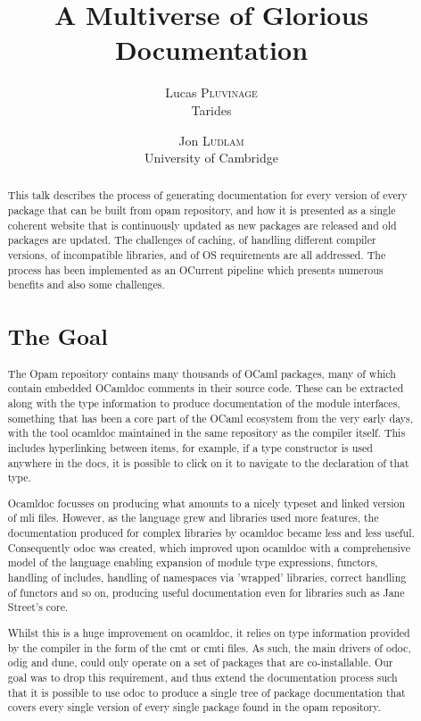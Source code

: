 \documentclass[a4paper,11pt,twocolumn]{scrartcl}
\title{A Multiverse of Glorious Documentation}
\author{
  Lucas \textsc{Pluvinage}\\
  Tarides
  \and
  Jon \textsc{Ludlam}\\
  University of Cambridge
}
\date{}
\begin{document}
\maketitle

\begin{abstract}

This talk describes the process of generating documentation for every version
of every package that can be built from opam repository, and how it is presented
as a single coherent website that is continuously updated as new packages are
released and old packages are updated. The challenges of caching, of handling
different compiler versions, of incompatible libraries, and of OS requirements are 
all addressed. The process has been implemented as an OCurrent pipeline which
presents numerous benefits and also some challenges.

\section{The Goal}
The Opam repository contains many thousands of OCaml packages, many of which
contain embedded OCamldoc comments in their source code. These can be extracted along with the type
information to produce documentation of the module interfaces, something that
has been a core part of the OCaml ecosystem from the very early days, with
the tool ocamldoc maintained in the same repository as the compiler itself. This
includes hyperlinking between items, for example, if a type constructor is used
anywhere in the docs, it is possible to click on it to navigate to the declaration
of that type.

Ocamldoc focusses on producing what amounts to a nicely typeset and linked version
of mli files. However, as the language grew and libraries used more features, the documentation produced
for complex libraries by ocamldoc became less and less useful. Consequently odoc 
was created, which improved upon ocamldoc with a comprehensive model of the
language enabling expansion of module type expressions, functors, handling
of includes, handling of namespaces via 'wrapped' libraries, correct handling of functors and so on, producing
useful documentation even for libraries such as Jane Street's core. 

Whilst this is a huge improvement on ocamldoc, it relies on type information provided
by the compiler in the form of the cmt or cmti files. As such, the main drivers of
odoc, odig and dune, could only operate on a set of packages that are co-installable.
Our goal was to drop this requirement, and thus extend the documentation process such that it is possible to use odoc to produce a single tree of
package documentation that covers every single version of every single package found in
the opam repository.


\end{abstract}
\end{document}
